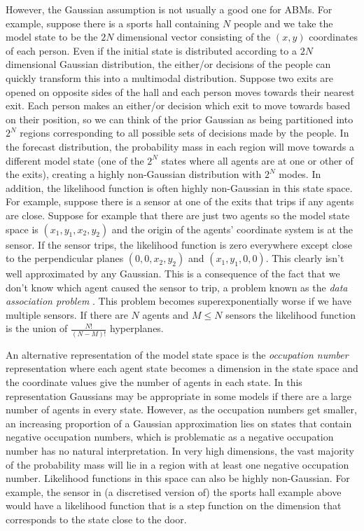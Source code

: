 \documentclass{article}
\begin{document}
However, the Gaussian assumption is not usually a good one for ABMs. For example, suppose there is a sports hall containing $N$ people and we take the model state to be the $2N$ dimensional vector consisting of the $(x,y)$ coordinates of each person. Even if the initial state is distributed according to a $2N$ dimensional Gaussian distribution, the either/or decisions of the people can quickly transform this into a multimodal distribution. Suppose two exits are opened on opposite sides of the hall and each person moves towards their nearest exit. Each person makes an either/or decision which exit to move towards based on their position, so we can think of the prior Gaussian as being partitioned into $2^N$ regions corresponding to all possible sets of decisions made by the people. In the forecast distribution, the probability mass in each region will move towards a different model state (one of the $2^N$ states where all agents are at one or other of the exits), creating a highly non-Gaussian distribution with $2^N$ modes. In addition, the likelihood function is often highly non-Gaussian in this state space. For example, suppose there is a sensor at one of the exits that trips if any agents are close. Suppose for example that there are just two agents so the model state space is $(x_1,y_1,x_2,y_2)$ and the origin of the agents' coordinate system is at the sensor. If the sensor trips, the likelihood function is zero everywhere except close to the perpendicular planes $(0,0,x_2,y_2)$ and $(x_1,y_1,0,0)$. This clearly isn't well approximated by any Gaussian. This is a consequence of the fact that we don't know which agent caused the sensor to trip, a problem known as the \textit{data association problem} \citep{lueck_who_2019}. This problem becomes superexponentially worse if we have multiple sensors. If there are $N$ agents and $M \le N$ sensors the likelihood function is the union of $\frac{N!}{(N-M)!}$ hyperplanes.

An alternative representation of the model state space is the \textit{occupation number} representation where each agent state becomes a dimension in the state space and the coordinate values give the number of agents in each state. In this representation Gaussians may be appropriate in some models if there are a large number of agents in every state. However, as the occupation numbers get smaller, an increasing proportion of a Gaussian approximation lies on states that contain negative occupation numbers, which is problematic as a negative occupation number has no natural interpretation. In very high dimensions, the vast majority of the probability mass will lie in a region with at least one negative occupation number. Likelihood functions in this space can also be highly non-Gaussian. For example, the sensor in (a discretised version of) the sports hall example above would have a likelihood function that is a step function on the dimension that corresponds to the state close to the door.
\end{document}
